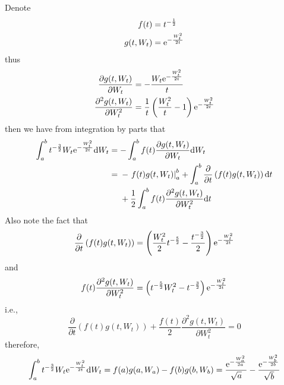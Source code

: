 \documentclass{homework}
\begin{document}
    \problem
    Denote
    \[\begin{aligned}
        f(t)&=t^{-\frac{1}{2}}\\
        g(t,W_t)&=\mathrm e^{-\frac{W_t^2}{2t}}
    \end{aligned}\]
    thus
    \[\begin{aligned}
        \frac{\partial g(t,W_t)}{\partial W_t}
        &=-\frac{W_t\mathrm e^{-\frac{W_t^2}{2t}}}{t}\\
        \frac{\partial^2 g(t,W_t)}{\partial W_t^2}
        &=\frac{1}{t}\left(\frac{W_t^2}{t}-1\right)\mathrm e^{-\frac{W_t^2}{2t}}
    \end{aligned}\]
    then we have from integration by parts that
    \[\begin{aligned}
        \int_a^bt^{-\frac{3}{2}}W_t\mathrm e^{-\frac{W_t^2}{2t}}\mathrm d W_t
        &=-\int_a^bf(t)\frac{\partial g(t,W_t)}{\partial W_t}\mathrm d W_t\\
        &=\begin{aligned}[t]
        &-\left.f(t)g(t,W_t)\right|_a^b
         +\int_a^b\frac{\partial}{\partial t}\left(f(t)g(t,W_t)\right)\mathrm d t\\
        &+\frac{1}{2}\int_a^bf(t)\frac{\partial^2g(t,W_t)}{\partial W_t^2}\mathrm d t
        \end{aligned}
    \end{aligned}\]
    Also note the fact that
    \[\frac{\partial}{\partial t}\left(f(t)g(t,W_t)\right)
    =\left(\frac{W_t^2}{2}t^{-\frac{5}{2}}-\frac{t^{-\frac{3}{2}}}{2}\right)
    \mathrm e^{-\frac{W_t^2}{2t}}\]
    and
    \[f(t)\frac{\partial^2g(t,W_t)}{\partial W_t^2}
    =\left(t^{-\frac{5}{2}}W_t^2-t^{-\frac{3}{2}}\right)\mathrm e^{-\frac{W_t^2}{2t}}\]
    i.e.,
    \[\frac{\partial}{\partial t}\left(f(t)g(t,W_t)\right)
    +\frac{f(t)}{2}\frac{\partial^2g(t,W_t)}{\partial W_t^2}=0\]
    therefore,
    \[\int_a^bt^{-\frac{3}{2}}W_t\mathrm e^{-\frac{W_t^2}{2t}}\mathrm d W_t
    =f(a)g(a,W_a)-f(b)g(b,W_b)=
    \frac{\mathrm e^{-\frac{W_a^2}{2a}}}{\sqrt a}
    -\frac{\mathrm e^{-\frac{W_b^2}{2b}}}{\sqrt b}\]
\end{document}
